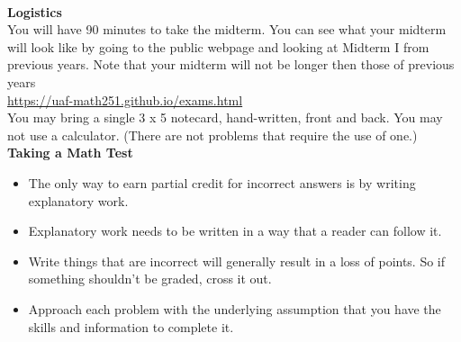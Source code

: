 \documentclass[11pt,fleqn]{article}
\begin{document}
\renewcommand{\headrulewidth}{0pt}
\newcommand{\blank}[1]{\rule{#1}{0.75pt}}
\newcommand{\bc}{\begin{center}}
\newcommand{\ec}{\end{center}}
\renewcommand{\d}{\displaystyle}

\vspace*{-0.7in}

\begin{center}
  \large
  \\
\end{center}
\noindent\textbf{Logistics}\\

You will have 90 minutes to take the midterm. You can see what your midterm will look like by going to the public webpage and looking at Midterm I from previous years. Note that your midterm will not be longer then those of previous years\\

\url{https://uaf-math251.github.io/exams.html}\\

You may bring a single 3 x 5 notecard, hand-written, front and back. You may not use a calculator. (There are not problems that require the use of one.)\\

%

\noindent\textbf{Taking a Math Test}

\begin{itemize}
\item The only way to earn partial credit for incorrect answers is by writing explanatory work.
\item Explanatory work needs to be written in a way that a reader can follow it.
\item Write things that are incorrect will generally result in a loss of points. So if something shouldn't be graded, cross it out.
\item Approach each problem with the underlying assumption that you have the skills and information to complete it.
\end{itemize}
\end{document}

